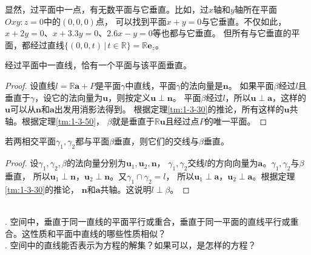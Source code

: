 \documentclass[12pt,UTF8,fontset=none]{ctexbook}
\begin{document}
显然，过平面中一点，有无数平面与它垂直。比如，过$x$轴和$y$轴所在平面$Oxy: z = 0$中的$(0,0,0)$点，
可以找到平面$x + y = 0$与它垂直。不仅如此，$x + 2y = 0$、$x + 3.3y = 0$、$2.6x - y = 0$等也都与它垂直。
但所有与它垂直的平面，都经过直线$\{(0,0,t) \, | \, t\in \mathbb{R}\} = \mathbb{R}\mathbf{e}_z$。
\begin{tm}\label{tm:1-3-90}
    经过平面中一直线，恰有一个平面与该平面垂直。    
\end{tm}
\begin{proof}
    设直线$l = \mathbb{R}\mathbf{a} + P$是平面$\gamma$中直线，平面$\gamma$的法向量是$\mathbf{n}$。
    如果平面$\beta$经过$l$且垂直于$\gamma$，设它的法向量为$\mathbf{u}$，则按定义$\mathbf{u}\perp\mathbf{n}$。
    平面$\beta$经过$l$，所以$\mathbf{u}\perp\mathbf{a}$，这样的$\mathbf{u}$可以从$\mathbf{n}$和$\mathbf{a}$出发用消影法得到。
    根据定理\ref{tm:1-3-30}的推论，所有这样的$\mathbf{u}$共轴。根据定理\ref{tm:1-3-50}，
    $\beta$就是垂直于$\mathbb{R}\mathbf{u}$且经过点$P$的唯一平面。
\end{proof}
\begin{tm}\label{tm:1-3-100}
    若两相交平面$\gamma_1,\gamma_2$都与平面$\beta$垂直，则它们的交线与$\beta$垂直。
\end{tm}
\begin{proof}
    设$\gamma_1,\gamma_2,\beta$的法向量分别为$\mathbf{u}_1,\mathbf{u}_2,\mathbf{n}$，
    $\gamma_1,\gamma_2$交线$l$的方向向量为$\mathbf{a}$。$\gamma_1,\gamma_2$与$\beta$垂直，
    所以$\mathbf{u}_1\perp\mathbf{n}$，$\mathbf{u}_2\perp\mathbf{n}$。又$\gamma_1\cap\gamma_2=l$，
    所以$\mathbf{u}_1\perp\mathbf{a}$，$\mathbf{u}_2\perp\mathbf{a}$。根据定理\ref{tm:1-3-30}的推论，
    $\mathbf{n}$和$\mathbf{a}$共轴。这说明$l\perp\beta$。
\end{proof}

\begin{sk}
    \mbox{} \\
    . 空间中，垂直于同一直线的平面平行或重合，垂直于同一平面的直线平行或重合。这性质和平面中直线的哪些性质相似？\\
    . 空间中的直线能否表示为方程的解集？如果可以，是怎样的方程？
\end{sk}
\end{document}
